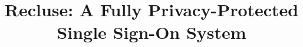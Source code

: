 \documentclass[conference, 10pt]{IEEEtran}
\begin{document}
\title{{Recluse}: A Fully Privacy-Protected Single Sign-On System}
%


\maketitle
















\end{document}
